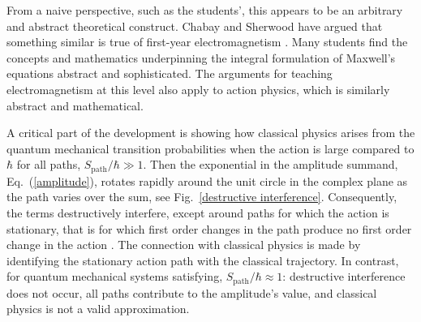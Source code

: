 \documentclass[prb,oncolumn,12pt]{revtex4-2}
\begin{document}
From a naive perspective, such as the students', this appears to be an arbitrary and abstract theoretical construct. Chabay and Sherwood have argued that something similar is true of first-year electromagnetism  \cite{ChabayEM}. Many students find the concepts and mathematics underpinning the integral formulation of Maxwell's equations abstract and sophisticated. The arguments for teaching electromagnetism at this level also apply to action physics, which is similarly abstract and mathematical.

A critical part of the development is showing how classical physics arises from the quantum mechanical transition probabilities when the action is large compared to $\hbar$ for all paths, $S_\textrm{path} / \hbar \gg 1$. Then the exponential in the amplitude summand, Eq.~(\ref{amplitude}), rotates rapidly around the unit circle in the complex plane as the path varies over the sum, see Fig.~\ref{destructive interference}. Consequently, the terms destructively interfere, except around paths for which the action is stationary, that is for which first order changes in the path produce no first order change in the action  \cite{TaylorCIP, Ogborn, QED}. The connection with classical physics is made by identifying the stationary action path with the classical trajectory. In contrast, for quantum mechanical systems satisfying, $S_\textrm{path} / \hbar \approx 1$: destructive interference does not occur, all paths contribute to the amplitude's value, and classical physics is not a valid approximation.
\end{document}
